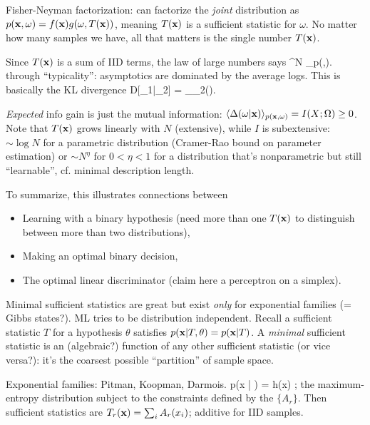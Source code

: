 \documentclass[notitlepage,openany,11pt]{report}
\theoremstyle{plain}%
\numberwithin{equation}{section}
\begin{document}
Fisher-Neyman factorization: can factorize the \emph{joint} distribution as $p(\mathbf{x},\omega) = f(\mathbf{x})g(\omega, T(\mathbf{x}))$, meaning $T(\mathbf{x})$ is a sufficient statistic for $\omega$. No matter how many samples we have, all that matters is the single number $T(\mathbf{x})$. 

Since $T(\mathbf{x})$ is a sum of IID terms, the law of large numbers says 
\be
{} \sum^{N} \log {} 
\left\langle \log {} \right\rangle_{p(,\omega)}.
\ee
through ``typicality'': asymptotics are dominated by the average logs. This is basically the KL divergence
 \leq D[\omega_{1}|\omega_{2}] = \left\langle \log {} \right\rangle_{\omega_{2}()}.
\ee

\emph{Expected} info gain is just the mutual information: $\langle \Delta(\omega|\mathbf{x}) \rangle_{p(\mathbf{x}, \omega)} = I(X; \Omega) \geq 0$. Note that $T(\mathbf{x})$ grows linearly with $N$ (extensive), while $I$ is subextensive: $\sim \log N$ for a parametric distribution (Cramer-Rao bound on parameter estimation) or $\sim N^{\eta}$ for $0 < \eta < 1$ for a distribution that's nonparametric but still ``learnable'', cf. minimal description length. 

To summarize, this illustrates connections between
\begin{itemize}
\item Learning with a binary hypothesis (need more than one $T(\mathbf{x})$ to distinguish between more than two distributions),
\item Making an optimal binary decision,
\item The optimal linear discriminator (claim here a perceptron on a simplex).
\end{itemize}

Minimal sufficient statistics are great but exist \emph{only} for exponential families (= Gibbs states?). ML tries to be distribution independent. Recall a sufficient statistic $T$ for a hypothesis $\theta$ satisfies $p(\mathbf{x}|T,\theta) = p(\mathbf{x}|T)$. A \emph{minimal} sufficient statistic is an (algebraic?) function of any other sufficient statistic (or vice versa?): it's the coarsest possible ``partition'' of sample space.

Exponential families: Pitman, Koopman, Darmois.
\be
p(x | \theta) = h(x) \exp {};
\ee
the maximum-entropy distribution subject to the constraints defined by the $\{ A_{r}\}$. Then sufficient statistics are $T_{r}(\mathbf{x}) = \sum_{i} A_{r}(x_{i})$; additive for IID samples.
\end{document}
